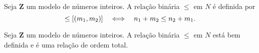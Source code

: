 \begin{defi}
	Seja $\bm Z$ um modelo de números inteiros. A relação binária $\leq$ em $N$ é definida por
	\begin{equation*}
	[(n_1,n_2)] \leq [(m_1,m_2)] \sse n_1+m_2 \leq n_2+m_1.
	\end{equation*}
\end{defi}

\begin{prop}
	Seja $\bm Z$ um modelo de números inteiros. A relação binária $\leq$ em $N$ está bem definida e é uma relação de ordem total.
\end{prop}


%
%
%
%
%
%
%
%
%



